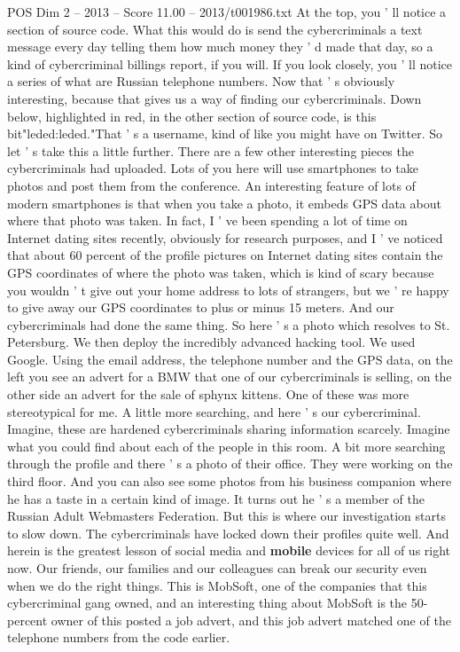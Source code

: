 \begin{textsample}{POS Dim 2 – 2013 – Score 11.00 – 2013/t001986.txt}
At the top, you ' ll notice a section of source code.
What this would do is send the cybercriminals a text message every day telling them how much money they ' d made that day, so a kind of cybercriminal billings report, if you will.
If you look closely, you ' ll notice a series of what are Russian telephone numbers.
Now that ' s obviously interesting, because that gives us a way of finding our cybercriminals.
Down below, highlighted in red, in the other section of source code, is this bit"leded:leded."That ' s a username, kind of like you might have on Twitter.
So let ' s take this a little further.
There are a few other interesting pieces the cybercriminals had uploaded.
Lots of you here will use smartphones to take photos and post them from the conference.
An interesting feature of lots of modern smartphones is that when you take a photo, it embeds GPS data about where that photo was taken.
In fact, I ' ve been spending a lot of time on Internet dating sites recently, obviously for research purposes, and I ' ve noticed that about 60 percent of the profile pictures on Internet dating sites contain the GPS coordinates of where the photo was taken, which is kind of scary because you wouldn ' t give out your home address to lots of strangers, but we ' re happy to give away our GPS coordinates to plus or minus 15 meters.
And our cybercriminals had done the same thing.
So here ' s a photo which resolves to St.
Petersburg.
We then deploy the incredibly advanced hacking tool.
We used Google.
Using the email address, the telephone number and the GPS data, on the left you see an advert for a BMW that one of our cybercriminals is selling, on the other side an advert for the sale of sphynx kittens.
One of these was more stereotypical for me.
A little more searching, and here ' s our cybercriminal.
Imagine, these are hardened cybercriminals sharing information scarcely.
Imagine what you could find about each of the people in this room.
A bit more searching through the profile and there ' s a photo of their office.
They were working on the third floor.
And you can also see some photos from his business companion where he has a taste in a certain kind of image.
It turns out he ' s a member of the Russian Adult Webmasters Federation.
But this is where our investigation starts to slow down.
The cybercriminals have locked down their profiles quite well.
And herein is the greatest lesson of social media and \textbf{mobile} devices for all of us right now.
Our friends, our families and our colleagues can break our security even when we do the right things.
This is MobSoft, one of the companies that this cybercriminal gang owned, and an interesting thing about MobSoft is the 50-percent owner of this posted a job advert, and this job advert matched one of the telephone numbers from the code earlier.

\end{textsample}
